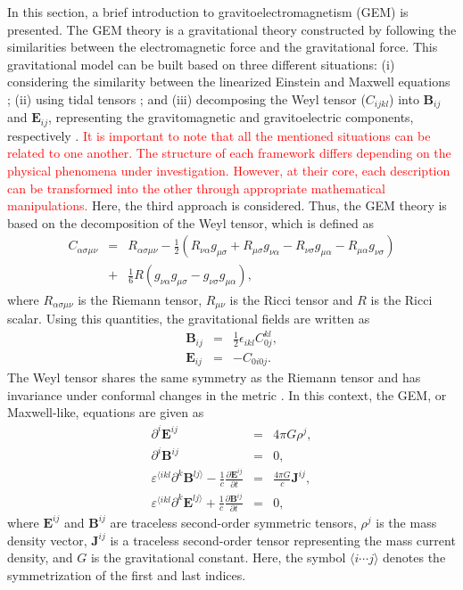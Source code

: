 \documentclass[11pt,showpacs,preprintnumbers,amsmath,amssymb,prd,nofootinbib,superscriptaddress]{revtex4-2}
\newcommand{\bea}{\begin{eqnarray}}
\newcommand{\eea}{\end{eqnarray}}
\begin{document}
In this section, a brief introduction to gravitoelectromagnetism (GEM) is presented. The GEM theory is a gravitational theory constructed by following the similarities between the electromagnetic force and the gravitational force. This gravitational model can be built based on three different situations: (i) considering the similarity between the linearized Einstein and Maxwell equations \cite{Mashhon}; (ii) using tidal tensors \cite{Filipe}; and (iii) decomposing the  Weyl tensor  ($C_{ijkl}$) into $\mathbf{B}_{ij}$ and $\mathbf{E}_{ij}$, representing the gravitomagnetic and gravitoelectric components, respectively \cite{Maartens}. \textcolor{red}{It is important to note that all the mentioned situations can be related to one another. The structure of each framework differs depending on the physical phenomena under investigation. However, at their core, each description can be transformed into the other through appropriate mathematical manipulations.} Here, the third approach is considered. Thus, the GEM theory is based on the decomposition of the Weyl tensor, which is defined as
\bea
C_{\alpha\sigma\mu\nu}&=&R_{\alpha\sigma\mu\nu}-\frac{1}{2}\left(R_{\nu\alpha}g_{\mu\sigma}+R_{\mu\sigma}g_{\nu\alpha}-R_{\nu\sigma}g_{\mu\alpha}-R_{\mu\alpha}g_{\nu\sigma}\right)\nonumber\\
&+&\frac{1}{6}R\left(g_{\nu\alpha}g_{\mu\sigma}-g_{\nu\sigma}g_{\mu\alpha}\right),
\eea
where $R_{\alpha\sigma\mu\nu}$ is the Riemann tensor, $R_{\mu\nu}$ is the Ricci tensor and $R$ is the Ricci scalar. Using this quantities, the gravitational fields are written as
\bea
\mathbf{B}_{ij}&=&\frac{1}{2}\epsilon_{ikl}C^{kl}_{0j},\\
\mathbf{E}_{ij}&=&-C_{0i0j}.
\eea
 The Weyl tensor shares the same symmetry as the Riemann tensor and has invariance under conformal changes in the metric \cite{danehkar2009significance}. In this context, the GEM, or Maxwell-like,  equations are given as
\begin{eqnarray}
    \partial^{i}\mathbf{E}^{ij}&=&4\pi G\rho^j,\label{2.2}\\
    \partial^{i}\mathbf{B}^{ij}&=&0,\label{2.3}\\
    \varepsilon^{\langle ikl}\partial^k \mathbf{B}^{lj\rangle}-\frac{1}{c}\frac{\partial \mathbf{E}^{ij}}{\partial t}&=&\frac{4\pi G}{c}\mathbf{J}^{ij},\label{2.4}\\
    \varepsilon^{\langle ikl}\partial^k \mathbf{E}^{lj\rangle}+\frac{1}{c}\frac{\partial \mathbf{B}^{ij}}{\partial t}&=&0,\label{2.5}
\end{eqnarray}
where $\mathbf{E}^{ij}$ and $\mathbf{B}^{ij}$ are traceless second-order symmetric tensors, $\rho^j$ is the mass density vector, $\mathbf{J}^{ij}$ is a traceless second-order tensor representing the mass current density, and $G$ is the gravitational constant. Here, the symbol $\langle i\cdots j \rangle$ denotes the
symmetrization of the first and last indices.
\end{document}
